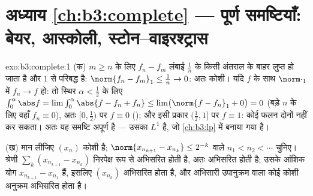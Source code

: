 \section*{अध्याय \ref{ch:b3:complete} --- पूर्ण समष्टियाँ:
बेयर, आस्कोली, स्टोन--वाइरश्ट्रास}

\begin{solution}{exo:b3:complete:1}
(क) $m \geq n$ के लिए $f_n - f_m$ लंबाई $\frac1n$ के किसी अंतराल के बाहर लुप्त हो जाता
है और $1$ से परिबद्ध है: $\norm{f_n - f_m}_1
\leq \frac1n \to 0$: अतः कोशी। यदि  $f$ के साथ $\norm\cdot_1$ में
$f_n \to f$ हो: तो स्थिर $\alpha <
\frac12$ के लिए $\int_0^{\alpha}\abs f = \lim \int_0^\alpha\abs{f -
f_n + f_n} \leq \lim\bigl(\norm{f - f_n}_1 + 0\bigr) = 0$ (बड़े $n$ के लिए वहाँ $f_n \equiv 0$), अतः
$[0, \frac12)$ पर $f \equiv 0$ (); और इसी प्रकार $(\frac12, 1]$ पर $f \equiv 1$: कोई  फलन
दोनों नहीं कर सकता। अतः यह समष्टि अपूर्ण है --- उसका  $L^1$
है, जो \cref{ch:b3:lp} में बनाया गया है।

(ख) मान लीजिए $(x_n)$ कोशी है; $\norm{x_{n_{k+1}} - x_{n_k}} \leq 2^{-k}$ वाले $n_1 < n_2 < \cdots$ चुनिए। श्रेणी $\sum_k (x_{n_{k+1}} - x_{n_k})$
निरपेक्ष रूप से अभिसरित होती है, अतः अभिसरित होती है; उसके आंशिक
योग $x_{n_{k+1}} - x_{n_1}$ हैं, इसलिए $(x_{n_k})$ अभिसरित होता है, और अभिसारी उपानुक्रम वाला
कोई कोशी अनुक्रम अभिसरित होता है।
\end{solution}

